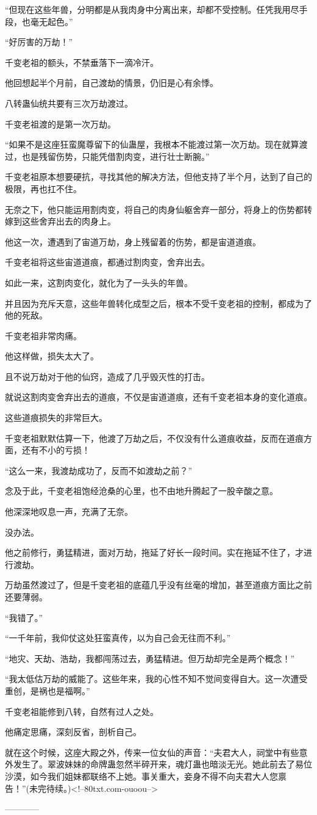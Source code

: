 \begin{this_body}
“但现在这些年兽，分明都是从我肉身中分离出来，却都不受控制。任凭我用尽手段，也毫无起色。”

“好厉害的万劫！”

千变老祖的额头，不禁垂落下一滴冷汗。

他回想起半个月前，自己渡劫的情景，仍旧是心有余悸。

八转蛊仙统共要有三次万劫渡过。

千变老祖渡的是第一次万劫。

“如果不是这座狂蛮魔尊留下的仙蛊屋，我根本不能渡过第一次万劫。现在就算渡过，也是残留伤势，只能凭借割肉变，进行壮士断腕。”

千变老祖原本想要硬抗，寻找其他的解决方法，但他支持了半个月，达到了自己的极限，再也扛不住。

无奈之下，他只能运用割肉变，将自己的肉身仙躯舍弃一部分，将身上的伤势都转嫁到这些舍弃出去的肉身上。

他这一次，遭遇到了宙道万劫，身上残留着的伤势，都是宙道道痕。

千变老祖将这些宙道道痕，都通过割肉变，舍弃出去。

如此一来，这割肉变化，就化为了一头头的年兽。

并且因为充斥天意，这些年兽转化成型之后，根本不受千变老祖的控制，都成为了他的死敌。

千变老祖非常肉痛。

他这样做，损失太大了。

且不说万劫对于他的仙窍，造成了几乎毁灭性的打击。

就说这割肉变舍弃出去的道痕，不仅是宙道道痕，还有千变老祖本身的变化道痕。

这些道痕损失的非常巨大。

千变老祖默默估算一下，他渡了万劫之后，不仅没有什么道痕收益，反而在道痕方面，还有不小的亏损！

“这么一来，我渡劫成功了，反而不如渡劫之前？”

念及于此，千变老祖饱经沧桑的心里，也不由地升腾起了一股辛酸之意。

他深深地叹息一声，充满了无奈。

没办法。

他之前修行，勇猛精进，面对万劫，拖延了好长一段时间。实在拖延不住了，才进行渡劫。

万劫虽然渡过了，但是千变老祖的底蕴几乎没有丝毫的增加，甚至道痕方面比之前还要薄弱。

“我错了。”

“一千年前，我仰仗这处狂蛮真传，以为自己会无往而不利。”

“地灾、天劫、浩劫，我都闯荡过去，勇猛精进。但万劫却完全是两个概念！”

“我太低估万劫的威能了。这些年来，我的心性不知不觉间变得自大。这一次遭受重创，是祸也是福啊。”

千变老祖能修到八转，自然有过人之处。

他痛定思痛，深刻反省，剖析自己。

就在这个时候，这座大殿之外，传来一位女仙的声音：“夫君大人，祠堂中有些意外发生了。翠波妹妹的命牌蛊忽然半碎开来，魂灯蛊也暗淡无光。她此前去了易位沙漠，如今我们姐妹都联络不上她。事关重大，妾身不得不向夫君大人您禀告！”(未完待续。)<!--80txt.com-ouoou-->

------------

\end{this_body}

